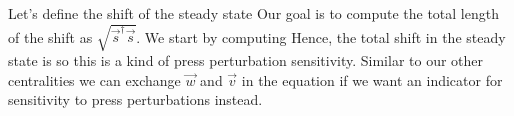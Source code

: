 Let's define the shift of the steady state
Our goal is to compute the total length of the shift as $\sqrt{\vec{s}^\dag\vec{s}}$. We start by computing 
Hence, the total shift in the steady state is 
so this is a kind of press perturbation sensitivity. Similar to our other centralities we can exchange $\vec{w}$ and $\vec{v}$ in the equation if we want an indicator for sensitivity to press perturbations instead. 
